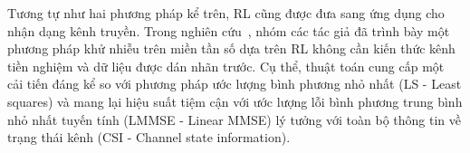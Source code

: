 Tương tự như hai phương pháp kể trên, RL cũng được đưa sang ứng dụng cho nhận dạng kênh truyền. Trong nghiên cứu~\cite{Oh2021}, nhóm các tác giả đã trình bày một phương pháp khử nhiễu trên miền tần số dựa trên RL không cần kiến thức kênh tiền nghiệm và dữ liệu được dán nhãn trước. Cụ thể, thuật toán cung cấp một cải tiến đáng kể so với phương pháp ước lượng bình phương nhỏ nhất (LS - Least squares) và mang lại hiệu suất tiệm cận với ước lượng lỗi bình phương trung bình nhỏ nhất tuyến tính (LMMSE - Linear MMSE) lý tưởng với toàn bộ thông tin về trạng thái kênh (CSI - Channel state information).